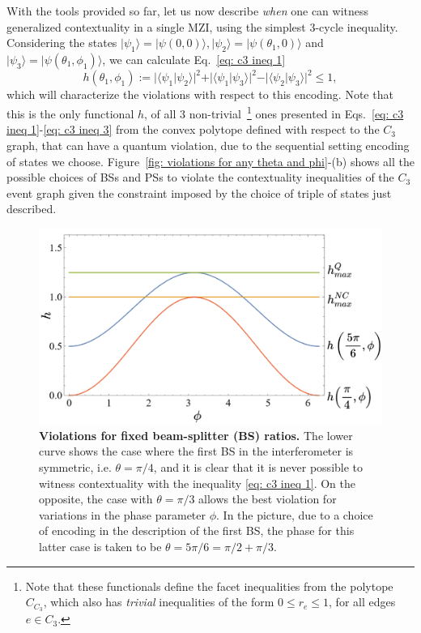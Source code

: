 \documentclass[a4paper,twocolumn,11pt,accepted=2024-01-17]{quantumarticle}
\begin{document}
With the tools provided so far, let us now describe \textit{when} one can witness generalized contextuality in a single MZI, using the simplest $3$-cycle inequality. {Considering the states $\vert \psi_1 \rangle = \vert \psi(0,0)\rangle, \vert \psi_2 \rangle = \vert \psi(\theta_1,0)\rangle$ and $\vert \psi_3 \rangle = \vert \psi(\theta_1,\phi_1)\rangle$,} we can calculate { Eq.~\eqref{eq: c3 ineq 1} 
\begin{equation}\label{eq: c3 functional for standard MZI}
    h(\theta_1,\phi_1) := \vert \langle \psi_1 \vert \psi_2 \rangle \vert^2 + \vert \langle \psi_1 \vert \psi_3 \rangle\vert^2 - \vert \langle \psi_2 \vert \psi_3 \rangle\vert^2 \leq 1,
\end{equation}}
which will characterize the violations with respect to this encoding. Note that this is the only functional $h$, of all $3$ non-trivial~\footnote{Note that these functionals define the facet inequalities from the polytope $C_{C_3}$, which also has \textit{trivial} inequalities of the form $0 \leq r_e \leq 1$, for all edges $e \in C_3$. } ones { presented in Eqs.~\eqref{eq: c3 ineq 1}-\eqref{eq: c3 ineq 3} from the convex polytope defined with respect to } the $C_3$ graph, that can have a quantum violation, due to the sequential setting encoding of states we choose. Figure~\ref{fig: violations for any theta and phi}-(b) shows all the possible choices of BSs and PSs to violate the contextuality inequalities of the $C_3$ event graph given the constraint imposed by the choice of triple of states just described. 
\begin{figure}[tb]
    \centering
    \includegraphics[width=\columnwidth]{Acc_Figures/sequentialBSviolations.png}
    \caption{\textbf{Violations for fixed beam-splitter (BS) ratios.} The lower curve shows the case where the first BS in the interferometer is symmetric, i.e. $\theta=\pi/4$, and it is clear that it is never possible to witness contextuality with the inequality \eqref{eq: c3 ineq 1}. On the opposite, the case with $\theta=\pi/3$ allows the best violation for variations in the phase parameter $\phi$. In the picture, due to a choice of encoding in the description of the first BS, the phase for this latter case is taken to be {$\theta=5\pi/6=\pi/2+\pi/3$}.}
    \label{fig:BS fixed violations}
\end{figure}
\end{document}
